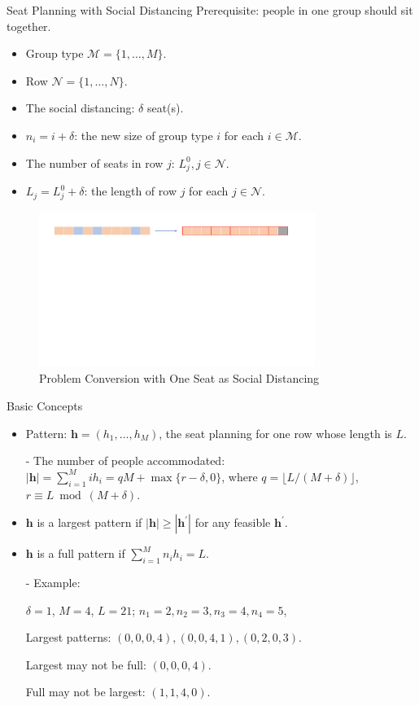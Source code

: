 \begin{frame}{Seat Planning with Social Distancing}
  Prerequisite: people in one group should sit together.
  \begin{itemize}  
    \item Group type $\mathcal{M} = \{1, \ldots, M\}$.
    \item Row $\mathcal{N} = \{1, \ldots, N\}$.
    \item The social distancing: $\delta$ seat(s).
    \item $n_i = i + \delta$: the new size of group type $i$ for each $i \in \mathcal{M}$.
    \item The number of seats in row $j$: $L_j^{0}, j \in \mathcal{N}$.
    \item $L_j = L_j^{0} + \delta$: the length of row $j$ for each $j \in \mathcal{N}$.
    \end{itemize}
    
    \begin{figure}[ht]
      \centering
      \includegraphics[width = 0.8\textwidth]{./images/dummy_seat.pdf}
      \caption{Problem Conversion with One Seat as Social Distancing}
  \end{figure}
  \end{frame}

  \begin{frame}{Basic Concepts}
    \begin{itemize}
      \item Pattern: $\bm{h} = (h_1, \ldots, h_M)$, the seat planning for one row whose length is $L$.

      - The number of people accommodated: $|\bm{h}| = \sum_{i =1}^{M} i h_i = qM + \max\{r-\delta, 0\}$, where $q = \lfloor L/(M + \delta) \rfloor$, $r \equiv L \bmod (M + \delta)$.
      
      \item $\bm{h}$ is a largest pattern if $|\bm{h}| \geq |\bm{h}^{\prime}|$ for any feasible $\bm{h}^{\prime}$. 
      \item $\bm{h}$ is a full pattern if $\sum_{i=1}^{M} n_i h_i = L$.
      \item[-] {\color{green} Example}: 
      
      $\delta = 1$, $M =4$, $L = 21$; $n_1 = 2, n_2 = 3, n_3 = 4, n_4 = 5$,
      
      Largest patterns: $(0, 0, 0, 4), (0, 0, 4, 1), (0, 2, 0, 3)$.

      Largest may not be full: $(0, 0, 0, 4)$.

      Full may not be largest: $(1, 1, 4, 0)$.
    \end{itemize}
  \end{frame}